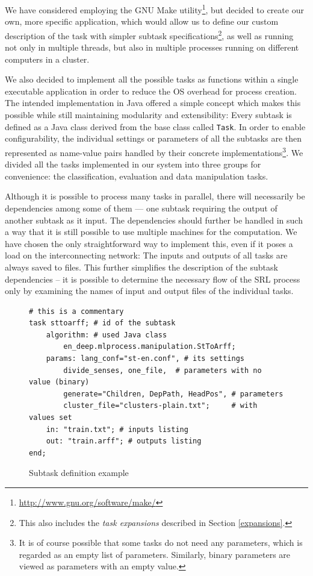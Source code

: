 \documentclass[12pt,notitlepage]{report}
\begin{document}
We have considered employing the GNU Make utility\footnote{\url{http://www.gnu.org/software/make/}}, but decided to create our own, more specific application, which would allow us to define our custom description of the task with simpler subtask specifications\footnote{This also includes the \emph{task expansions} described in Section \ref{expansions}.}, as well as running not only in multiple threads, but also in multiple processes running on different computers in a cluster. 

We also decided to implement all the possible tasks as functions within a single executable application in order to reduce the OS overhead for process creation. The intended implementation in Java offered a simple concept which makes this possible while still maintaining modularity and extensibility: Every subtask is defined as a Java class derived from the base class called \texttt{Task}. In order to enable configurability, the individual settings or parameters of all the subtasks are then represented as name-value pairs handled by their concrete implementations\footnote{It is of course possible that some tasks do not need any parameters, which is regarded as an empty list of parameters. Similarly, binary parameters are viewed as parameters with an empty value.}. We divided all the tasks implemented in our system into three groups for convenience: the classification, evaluation and data manipulation tasks.

Although it is possible to process many tasks in parallel, there will necessarily be dependencies among some of them --- one subtask requiring the output of another subtask as it input. The dependencies should further be handled in such a way that it is still possible to use multiple machines for the computation. We have chosen the only straightforward way to implement this, even if it poses a load on the interconnecting network: The inputs and outputs of all tasks are always saved to files. This further simplifies the description of the subtask dependencies -- it is possible to determine the necessary flow of the SRL process only by examining the names of input and output files of the individual tasks.

\begin{figure}
\caption{Subtask definition example}\label{fig:scenario}
\begin{center}
\begin{lstlisting}
# this is a commentary
task sttoarff; # id of the subtask
    algorithm: # used Java class
        en_deep.mlprocess.manipulation.StToArff; 
    params: lang_conf="st-en.conf", # its settings
        divide_senses, one_file,  # parameters with no value (binary)
        generate="Children, DepPath, HeadPos", # parameters
        cluster_file="clusters-plain.txt";     # with values set
    in: "train.txt"; # inputs listing
    out: "train.arff"; # outputs listing
end;
\end{lstlisting}
\end{center}
\end{figure}
\end{document}
